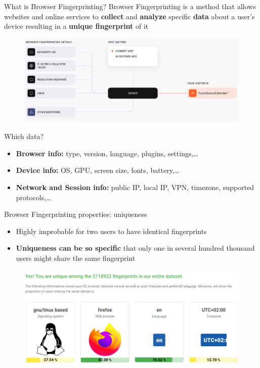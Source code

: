 \begin{frame}{What is Browser Fingerprinting?}
  Browser Fingerprinting is a method that allows websites and online services to \textbf{collect} and \textbf{analyze} specific \textbf{data} about a user's device resulting in a \textbf{unique fingerprint} of it
  \begin{figure}
    \centering
    \includegraphics[width=\linewidth]{images/fingerprint.png}
  \end{figure}
\end{frame}

\begin{frame}{Which data?}
  \begin{itemize}
    \item \textbf{Browser info:} type, version, language, plugins, settings,\dots
          \vspace{1cm}
    \item \textbf{Device info:} OS, GPU, screen size, fonts, battery,\dots
          \vspace{1cm}
    \item \textbf{Network and Session info:} public IP, local IP, VPN, timezone, supported protocols,\dots
  \end{itemize}
\end{frame}

\begin{frame}{Browser Fingerprinting properties: uniqueness}
  \begin{itemize}
    \item Highly improbable for two users to have identical fingerprints
    \item \textbf{Uniqueness can be so specific} that only one in several hundred thousand users might share the same fingerprint
  \end{itemize}
  \begin{figure}
    \centering
    \includegraphics[width=\linewidth]{images/uniqueness.png}
  \end{figure}
\end{frame}

